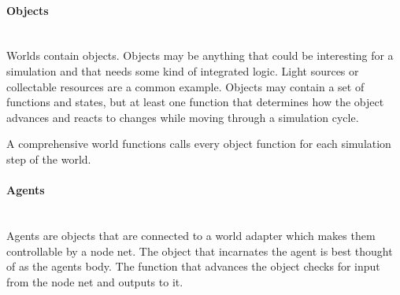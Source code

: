         \paragraph{Objects}$\;$ \\
Worlds contain objects. Objects may be anything that could be interesting for a simulation and that needs some kind of integrated logic. Light sources or collectable resources are a common example. Objects may contain a set of functions and states, but at least one function that determines how the object advances and reacts to changes while moving through a simulation cycle. 

A comprehensive world functions calls every object function for each simulation step of the world.

        \paragraph{Agents}$\;$ \\
Agents are objects that are connected to a world adapter which makes them controllable by a node net. The object that incarnates the agent is best thought of as the agents body. The function that advances the object checks for input from the node net and outputs to it.
        